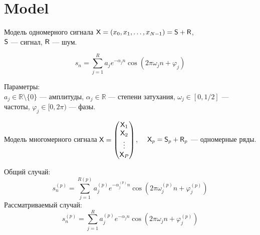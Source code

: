 \documentclass[ucs, notheorems, handout]{beamer}
\begin{document}
    \section{Model}\label{sec:model}
    \begin{frame}{Модель одномерного сигнала}
        $\mathsf{X} = (x_0, x_1, \ldots, x_{N-1}) = \mathsf{S} + \mathsf{R}$,\\
        $\mathsf{S}$ --- сигнал, $\mathsf{R}$ --- шум.

        \vspace{0.4cm}

        \[
            s_n = \sum_{j=1}^{R} a_j e^{ -\alpha_j n }
            \cos\left( 2 \pi \omega_j n + \varphi_j\right)
        \]

        \vspace{0.3cm}
        Параметры:\\
        $a_j \in \mathbb{R}\setminus\{0\}$ --- амплитуды, $\alpha_j \in \mathbb{R}$ --- степени затухания,
        $\omega_j \in [0, 1/2]$ --- частоты, $\varphi_j \in [0, 2\pi)$ --- фазы.

    \end{frame}

    \begin{frame}{Модель многомерного сигнала}
        $\mathsf{X} =
        \begin{pmatrix}
            \mathsf{X}_1  \\
            \mathsf{X}_2  \\
            \vdots \\
            \mathsf{X}_P
        \end{pmatrix}
        $, $\quad\mathsf{X}_p = \mathsf{S}_p + \mathsf{R}_p$ --- одномерные ряды.

        \vspace{0.4cm}
        Общий случай:
        \[
            s_n^{(p)} = \sum_{j=1}^{R(p)} a_j^{(p)} e^{ -\alpha_j^{(p)} n }
            \cos\left( 2 \pi \omega_j^{(p)} n + \varphi_j^{(p)}\right)
        \]
        Рассматриваемый случай:
        \[
            s_n^{(p)} = \sum_{j=1}^{R} a_j^{(p)} e^{ -\alpha_j n }
            \cos\left( 2 \pi \omega_j n + \varphi_j^{(p)}\right)
        \]
    \end{frame}
\end{document}
